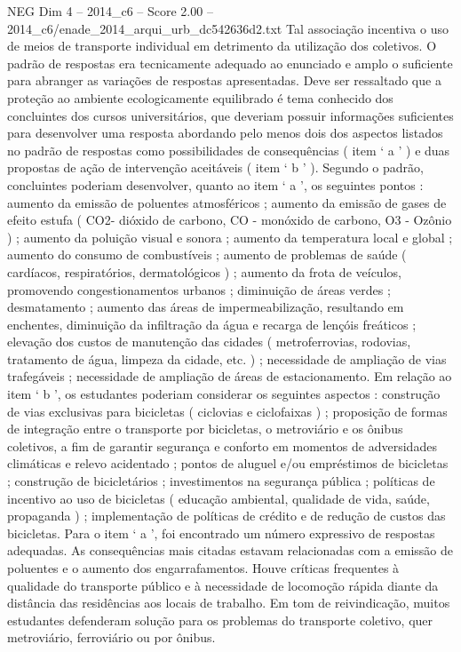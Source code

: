 \begin{textsample}{NEG Dim 4 – 2014\_c6 – Score 2.00 – 2014\_c6/enade\_2014\_arqui\_urb\_dc542636d2.txt}
Tal associação incentiva o uso de meios de transporte individual em detrimento da utilização dos coletivos.
O padrão de respostas era tecnicamente adequado ao enunciado e amplo o suficiente para abranger as variações de respostas apresentadas.
Deve ser ressaltado que a proteção ao ambiente ecologicamente equilibrado é tema conhecido dos concluintes dos cursos universitários, que deveriam possuir informações suficientes para desenvolver uma resposta abordando pelo menos dois dos aspectos listados no padrão de respostas como possibilidades de consequências ( item ‘ a ’ ) e duas propostas de ação de intervenção aceitáveis ( item ‘ b ’ ).
Segundo o padrão, concluintes poderiam desenvolver, quanto ao item ‘ a ’, os seguintes pontos : aumento da emissão de poluentes atmosféricos ; aumento da emissão de gases de efeito estufa ( CO2- dióxido de carbono, CO - monóxido de carbono, O3 - Ozônio ) ; aumento da poluição visual e sonora ; aumento da temperatura local e global ; aumento do consumo de combustíveis ; aumento de problemas de saúde ( cardíacos, respiratórios, dermatológicos ) ; aumento da frota de veículos, promovendo congestionamentos urbanos ; diminuição de áreas verdes ; desmatamento ; aumento das áreas de impermeabilização, resultando em enchentes, diminuição da infiltração da água e recarga de lençóis freáticos ; elevação dos custos de manutenção das cidades ( metroferrovias, rodovias, tratamento de água, limpeza da cidade, etc. ) ; necessidade de ampliação de vias trafegáveis ; necessidade de ampliação de áreas de estacionamento.
Em relação ao item ‘ b ’, os estudantes poderiam considerar os seguintes aspectos : construção de vias exclusivas para bicicletas ( ciclovias e ciclofaixas ) ; proposição de formas de integração entre o transporte por bicicletas, o metroviário e os ônibus coletivos, a fim de garantir segurança e conforto em momentos de adversidades climáticas e relevo acidentado ; pontos de aluguel e/ou empréstimos de bicicletas ; construção de bicicletários ; investimentos na segurança pública ; políticas de incentivo ao uso de bicicletas ( educação ambiental, qualidade de vida, saúde, propaganda ) ; implementação de políticas de crédito e de redução de custos das bicicletas.
Para o item ‘ a ’, foi encontrado um número expressivo de respostas adequadas.
As consequências mais citadas estavam relacionadas com a emissão de poluentes e o aumento dos engarrafamentos.
Houve críticas frequentes à qualidade do transporte público e à necessidade de locomoção rápida diante da distância das residências aos locais de trabalho.
Em tom de reivindicação, muitos estudantes defenderam solução para os problemas do transporte coletivo, quer metroviário, ferroviário ou por ônibus.

\end{textsample}
